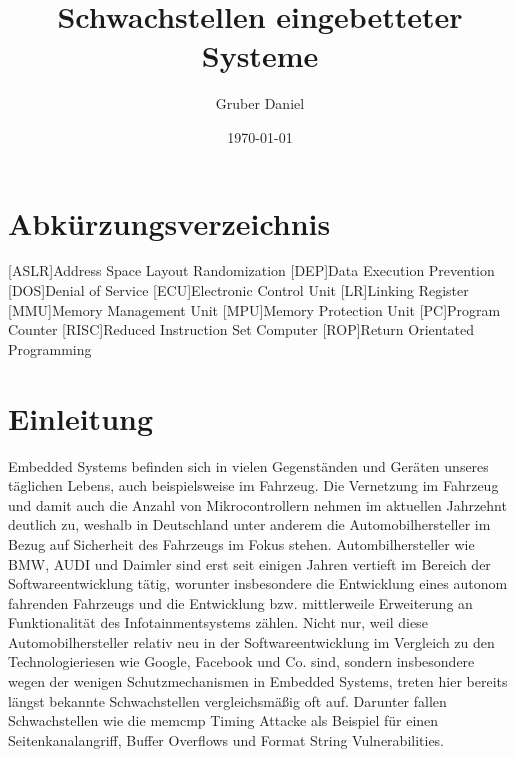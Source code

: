 \documentclass[a4paper,
DIV=13,
12pt,
BCOR=10mm,
department=FakIM,
oneside,
parskip=half,
automark,
listof=totocnumbered,
bibliography=totocnumbered,
acronym=totocnumbered
] {OTHRartcl}
\date{\today}
\title{Schwachstellen eingebetteter Systeme}
\author{Gruber Daniel}
\begin{document}
\maketitle

\tableofcontents
\newpage

\section*{Abkürzungsverzeichnis}
\label{abkuerzungsverzeichnis}
\begin{acronym}[AUTOSAR]
  [ASLR]{Address Space Layout Randomization}
  [DEP]{Data Execution Prevention}
  [DOS]{Denial of Service}
  [ECU]{Electronic Control Unit}
  [LR]{Linking Register}
  [MMU]{Memory Management Unit}
  [MPU]{Memory Protection Unit}
  [PC]{Program Counter}
  [RISC]{Reduced Instruction Set Computer}
  [ROP]{Return Orientated Programming}
\end{acronym}
\newpage

\section{Einleitung}
\label{sec:Einleitung}
Embedded Systems befinden sich in vielen Gegenständen und Geräten unseres täglichen Lebens, auch beispielsweise im Fahrzeug.
Die Vernetzung im Fahrzeug und damit auch die Anzahl von Mikrocontrollern nehmen im aktuellen Jahrzehnt deutlich zu, weshalb in Deutschland unter anderem die Automobilhersteller im Bezug auf Sicherheit des Fahrzeugs im Fokus stehen.
Autombilhersteller wie BMW, AUDI und Daimler sind erst seit einigen Jahren vertieft im Bereich der Softwareentwicklung tätig, worunter insbesondere die Entwicklung eines autonom fahrenden Fahrzeugs und die Entwicklung
bzw. mittlerweile Erweiterung an Funktionalität des Infotainmentsystems zählen. Nicht nur, weil diese Automobilhersteller relativ neu in der Softwareentwicklung im Vergleich zu den Technologieriesen wie Google, Facebook und Co.
sind, sondern insbesondere wegen der wenigen Schutzmechanismen in Embedded Systems, treten hier bereits längst bekannte Schwachstellen vergleichsmäßig oft auf.
Darunter fallen Schwachstellen wie die memcmp Timing Attacke als Beispiel für einen Seitenkanalangriff, Buffer Overflows und Format String Vulnerabilities. \cite{car format string vuln.} \cite{McKinsey}
\end{document}
